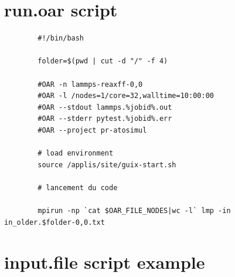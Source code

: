 \documentclass[11pt]{report}
\renewcommand\footrulewidth{0.5pt}
\renewcommand\footrulewidth{0.5pt}
\begin{document}
\begin{appendices}


\renewcommand\footrulewidth{0.5pt}
\setlength{\headheight}{46pt}
\setlength{\headsep}{15pt}
\setlength{\topmargin}{-26pt}
\setlength{\textwidth}{15cm}
\setcounter{secnumdepth}{4}
\setcounter{tocdepth}{4}


\renewcommand{\thesection}{\Alph{section})}

\section{run.oar script}
\label{section:run_oar}
    \begin{verbatim}
        #!/bin/bash

        folder=$(pwd | cut -d "/" -f 4)

        #OAR -n lammps-reaxff-0,0
        #OAR -l /nodes=1/core=32,walltime=10:00:00
        #OAR --stdout lammps.%jobid%.out
        #OAR --stderr pytest.%jobid%.err
        #OAR --project pr-atosimul

        # load environment
        source /applis/site/guix-start.sh

        # lancement du code

        mpirun -np `cat $OAR_FILE_NODES|wc -l` lmp -in in_older.$folder-0,0.txt
    \end{verbatim}

\section{input.file script example}
\label{section:input_lammps}
    \inputminted[]{text}{/Users/thibault/Documents/Meca-ML/run_lammps_test/in.crack_V3.txt}
\end{appendices}
\end{document}
